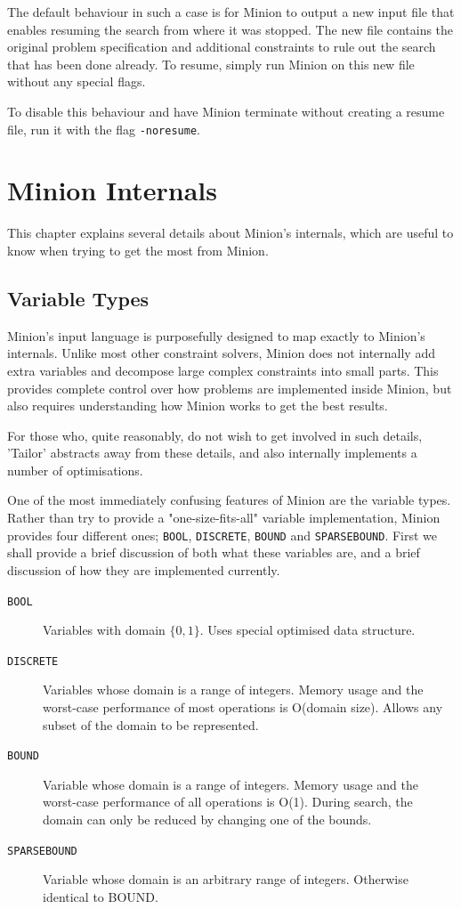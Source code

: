 \documentclass[oneside]{book}
\newcommand{\BOOL}{\texttt{BOOL}\xspace}
\newcommand{\DISCRETE}{\texttt{DISCRETE}\xspace}
\newcommand{\BOUND}{\texttt{BOUND}\xspace}
\newcommand{\SPARSEBOUND}{\texttt{SPARSEBOUND}\xspace}
\begin{document}
The default behaviour in such a case is for Minion to output a new input file
that enables resuming the search from where it was stopped. The new file
contains the original problem specification and additional constraints to rule
out the search that has been done already. To resume, simply run Minion on this
new file without any special flags.

To disable this behaviour and have Minion terminate without creating a resume
file, run it with the flag \texttt{-noresume}.

\chapter{Minion Internals}

This chapter explains several details about Minion's internals, which are useful to know when trying to get the most from Minion.

\section{Variable Types}

Minion's input language is purposefully designed to map exactly to Minion's internals. Unlike most other constraint solvers, Minion does not internally add extra variables and decompose large complex constraints into small parts. This provides complete control over how problems are implemented inside Minion, but also requires understanding how Minion works to get the best results.

For those who, quite reasonably, do not wish to get involved in such details, 'Tailor' abstracts away from these details, and also internally implements a number of optimisations.

One of the most immediately confusing features of Minion are the variable types. Rather than try to provide a "one-size-fits-all" variable implementation, Minion provides four different ones; \BOOL, \DISCRETE, \BOUND and \SPARSEBOUND.  First we shall provide a brief discussion of both what these variables are, and a brief discussion of how they are implemented currently.

\begin{description}
\item[\BOOL] Variables with domain \(\{0,1\}\). Uses special optimised data structure.
\item[\DISCRETE] Variables whose domain is a range of integers. Memory usage and the worst-case performance of most operations is O(domain size). Allows any subset of the domain to be represented.
\item[\BOUND] Variable whose domain is a range of integers. Memory usage and the worst-case performance of all operations is O(1). During search, the domain can only be reduced by changing one of the bounds.
\item[\SPARSEBOUND] Variable whose domain is an arbitrary range of integers. Otherwise identical to BOUND.
\end{description}
\end{document}
